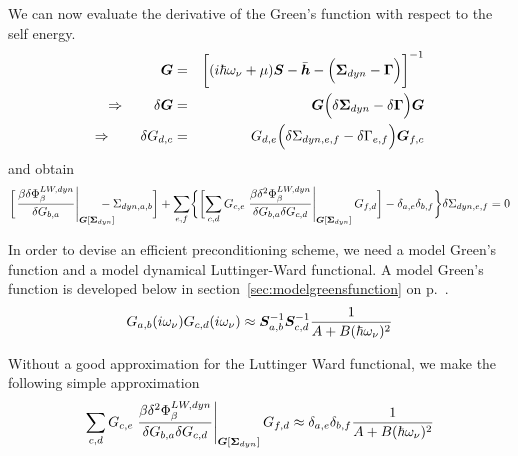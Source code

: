 \documentclass[11pt,a4paper]{report}
\begin{document}
We can now evaluate the derivative of the Green's function with
respect to the self energy.
\begin{eqnarray}
\bm{G}&=&\biggl[(i\hbar\omega_\nu+\mu)\bm{S}-\bar{\bm{h}}
-\Bigl(\bm{\Sigma}_{dyn}-\bm{\Gamma}\Bigr)\biggr]^{-1}
\nonumber\\
\Rightarrow\qquad
\delta\bm{G}&=&\bm{G}\Bigl(\delta\bm{\Sigma}_{dyn}
-\delta\bm{\Gamma}\Bigr)\bm{G}
\nonumber\\
\Rightarrow\qquad
\delta{G}_{d,c}&=&{G}_{d,e}\Bigl(\delta{\Sigma}_{dyn,e,f}
-\delta{\Gamma}_{e,f}\Bigr)\bm{G}_{f,c}
\end{eqnarray}
and obtain
\begin{eqnarray}
\biggl[\left.\frac{\beta\delta\Phi^{LW,dyn}_\beta}{\delta G_{b,a}}
\right|_{\mat{G}[\mat{\Sigma}_{dyn}]}\hspace{-0.5cm}
-\Sigma_{dyn,a,b}
\biggr]
+
\sum_{e,f}
\biggl\lbrace
\biggl[\sum_{c,d}
G_{c,e}
\left.\frac{\beta\delta^2\Phi^{LW,dyn}_\beta}
{\delta{G}_{b,a}\delta{G}_{c,d}}
\right|_{\mat{G}[\mat{\Sigma}_{dyn}]}
G_{f,d}
\biggr]-\delta_{a,e}\delta_{b,f}
\biggr\rbrace
\delta\Sigma_{dyn,e,f}
=0
\nonumber\\
\end{eqnarray}


In order to devise an efficient preconditioning scheme, we need a
model Green's function and a model dynamical Luttinger-Ward
functional. A model Green's function is developed below in
section~\ref{sec:modelgreensfunction} on
p.~\pageref{sec:modelgreensfunction}.
\begin{eqnarray}
G_{a,b}(i\omega_\nu)
G_{c,d}(i\omega_\nu)
\approx \bm{S}^{-1}_{a,b}\bm{S}^{-1}_{c,d}
\frac{1}{A+B(\hbar\omega_\nu)^2}
\end{eqnarray}

Without a good approximation for the Luttinger Ward functional, we
make the following simple approximation
\begin{eqnarray}
\sum_{c,d}
G_{c,e}
\left.\frac{\beta\delta^2\Phi^{LW,dyn}_\beta}
{\delta{G}_{b,a}\delta{G}_{c,d}}
\right|_{\bm{G}[\bm{\Sigma}_{dyn}]}
G_{f,d}
\approx 
\delta_{a,e}\delta_{b,f}
\frac{1}{A+B(\hbar\omega_\nu)^2}
\end{eqnarray}
\end{document}
